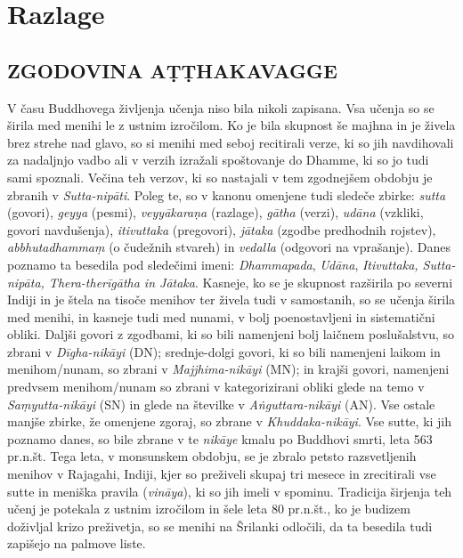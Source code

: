 
\chapter{Razlage}

\section{ZGODOVINA AṬṬHAKAVAGGE}

V času Buddhovega življenja učenja niso bila nikoli zapisana. Vsa učenja
so se širila med menihi le z ustnim izročilom. Ko je bila skupnost še
majhna in je živela brez strehe nad glavo, so si menihi med seboj
recitirali verze, ki so jih navdihovali za nadaljnjo vadbo ali v verzih
izražali spoštovanje do Dhamme, ki so jo tudi sami spoznali. Večina teh
verzov, ki so nastajali v tem zgodnejšem obdobju je zbranih v
\emph{Sutta-nipāti}. Poleg te, so v kanonu omenjene tudi sledeče zbirke:
\emph{sutta} (govori), \emph{geyya} (pesmi), \emph{veyyākaraṇa}
(razlage), \emph{gātha} (verzi), \emph{udāna} (vzkliki, govori
navdušenja), \emph{itivuttaka} (pregovori), \emph{jātaka} (zgodbe
predhodnih rojstev), \emph{abbhutadhammaṃ} (o čudežnih stvareh) in
\emph{vedalla} (odgovori na vprašanje). Danes poznamo ta besedila pod
sledečimi imeni: \emph{Dhammapada}, \emph{Udāna}, \emph{Itivuttaka,
Sutta-nipāta, Thera-therīgātha in Jātaka}. Kasneje, ko se je skupnost
razširila po severni Indiji in je štela na tisoče menihov ter živela
tudi v samostanih, so se učenja širila med menihi, in kasneje tudi med
nunami, v bolj poenostavljeni in sistematični obliki. Daljši govori z
zgodbami, ki so bili namenjeni bolj laičnem poslušalstvu, so zbrani v
\emph{Dīgha-nikāyi} (DN); srednje-dolgi govori, ki so bili namenjeni
laikom in menihom/nunam, so zbrani v \emph{Majjhima-nikāyi} (MN); in
krajši govori, namenjeni predvsem menihom/nunam so zbrani v
kategorizirani obliki glede na temo v \emph{Saṃyutta-nikāyi} (SN) in
glede na številke v \emph{Aṅguttara-nikāyi} (AN). Vse ostale manjše
zbirke, že omenjene zgoraj, so zbrane v \emph{Khuddaka-nikāyi}. Vse
sutte, ki jih poznamo danes, so bile zbrane v te \emph{nikāye} kmalu po
Buddhovi smrti, leta 563 pr.n.št. Tega leta, v monsunskem obdobju, se je
zbralo petsto razsvetljenih menihov v Rajagahi, Indiji, kjer so
preživeli skupaj tri mesece in zrecitirali vse sutte in meniška pravila
(\emph{vināya}), ki so jih imeli v spominu. Tradicija širjenja teh učenj
je potekala z ustnim izročilom in šele leta 80 pr.n.št., ko je budizem
doživljal krizo preživetja, so se menihi na Šrilanki odločili, da ta
besedila tudi zapišejo na palmove liste.

